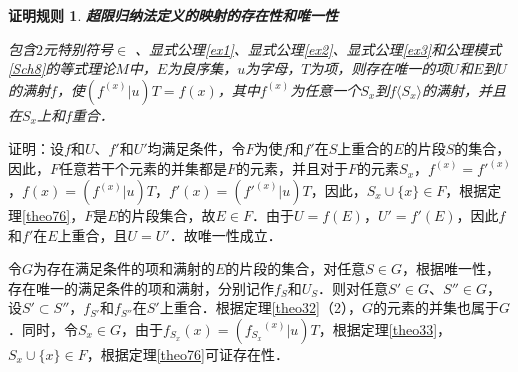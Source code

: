 \documentclass[12pt, a4paper, oneside]{book}
\newtheorem{C}{证明规则}
\begin{document}
			\begin{C}\label{C60}
				\textbf{超限归纳法定义的映射的存在性和唯一性}
				\par
				包含$2$元特别符号$\in$ 、显式公理\ref{ex1}、显式公理\ref{ex2}、显式公理\ref{ex3}和公理模式\ref{Sch8}的等式理论$M$中，$E$为良序集，$u$为字母，$T$为项，则存在唯一的项$U$和$E$到$U$的满射$f$，使$(f^{(x)}|u)T=f(x)$，其中$f^{(x)}$为任意一个$S_x$到$f\langle S_x\rangle$的满射，并且在$S_x$上和$f$重合．
			\end{C}					
			证明：设$f$和$U$、$f'$和$U'$均满足条件，令$F$为使$f$和$f'$在$S$上重合的$E$的片段$S$的集合，因此，$F$任意若干个元素的并集都是$F$的元素，并且对于$F$的元素$S_x$，$f^{(x)}= {f'}^{(x)}$，$f(x)=(f^{(x)}|u)T$，$f'(x)= ({f'}^{(x)}|u)T$，因此，$S_x\cup\{x\}\in F$，根据定理\ref{theo76}，$F$是$E$的片段集合，故$E\in F$．由于$U=f(E)$，$U'=f'(E)$，因此$f$和$f'$在$E$上重合，且$U=U'$．故唯一性成立．
			\par
			令$G$为存在满足条件的项和满射的$E$的片段的集合，对任意$S\in G$，根据唯一性，存在唯一的满足条件的项和满射，分别记作$f_S$和$U_S$．则对任意$S'\in G$、$S''\in G$，设$S'\subset S''$，$f_{S'}$和$f_{S''}$在$S'$上重合．根据定理\ref{theo32}（2），$G$的元素的并集也属于$G$．同时，令$S_x\in G$，由于$f_{S_x}(x)= ({f_{S_x}}^{(x)}|u)T$，根据定理\ref{theo33}，$S_x\cup\{x\}\in F$，根据定理\ref{theo76}可证存在性．
\end{document}
